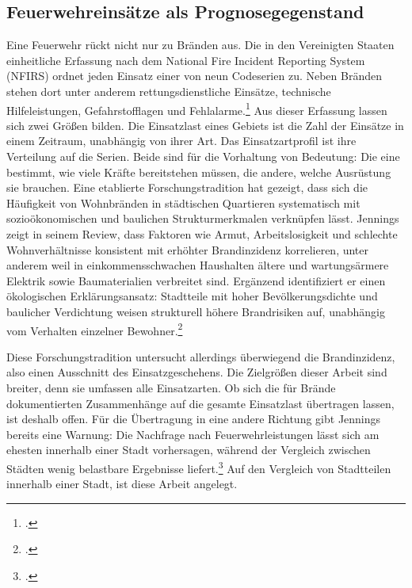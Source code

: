 \documentclass[12pt,a4paper]{article}
\begin{document}
\subsection{Feuerwehreinsätze als Prognosegegenstand}



Eine Feuerwehr rückt nicht nur zu Bränden aus. Die in den Vereinigten Staaten einheitliche Erfassung
nach dem National Fire Incident Reporting System (NFIRS) ordnet jeden Einsatz einer von neun Codeserien zu.
Neben Bränden stehen dort unter anderem rettungsdienstliche Einsätze, technische Hilfeleistungen,
Gefahrstofflagen und Fehlalarme.\footcite[3-21]{USFA2015} Aus dieser Erfassung lassen sich zwei
Größen bilden. Die Einsatzlast eines Gebiets ist die Zahl der Einsätze in einem Zeitraum, unabhängig
von ihrer Art. Das Einsatzartprofil ist ihre Verteilung auf die Serien. Beide sind für die Vorhaltung
von Bedeutung: Die eine bestimmt, wie viele Kräfte bereitstehen müssen, die andere, welche Ausrüstung
sie brauchen.
Eine etablierte Forschungstradition hat gezeigt, dass sich die Häufigkeit von Wohnbränden in
städtischen Quartieren systematisch mit sozioökonomischen und baulichen Strukturmerkmalen
verknüpfen lässt. Jennings zeigt in seinem Review, dass Faktoren wie Armut, Arbeitslosigkeit und
schlechte Wohnverhältnisse konsistent mit erhöhter Brandinzidenz korrelieren, unter anderem weil
in einkommensschwachen Haushalten ältere und wartungsärmere Elektrik sowie Baumaterialien
verbreitet sind. Ergänzend identifiziert er einen ökologischen Erklärungsansatz: Stadtteile mit
hoher Bevölkerungsdichte und baulicher Verdichtung weisen strukturell höhere Brandrisiken auf,
unabhängig vom Verhalten einzelner Bewohner.\footcite[14, 27]{Jennings1999}


Diese Forschungstradition untersucht allerdings überwiegend die Brandinzidenz, also einen Ausschnitt
des Einsatzgeschehens. Die Zielgrößen dieser Arbeit sind breiter, denn sie umfassen alle Einsatzarten.
Ob sich die für Brände dokumentierten Zusammenhänge auf die gesamte Einsatzlast übertragen lassen, ist
deshalb offen. Für die Übertragung in eine andere Richtung gibt Jennings bereits eine Warnung: Die
Nachfrage nach Feuerwehrleistungen lässt sich am ehesten innerhalb einer Stadt vorhersagen, während
der Vergleich zwischen Städten wenig belastbare Ergebnisse liefert.\footcite[14]{Jennings1999} Auf den Vergleich von Stadtteilen innerhalb einer Stadt, ist diese Arbeit
angelegt.
\end{document}
